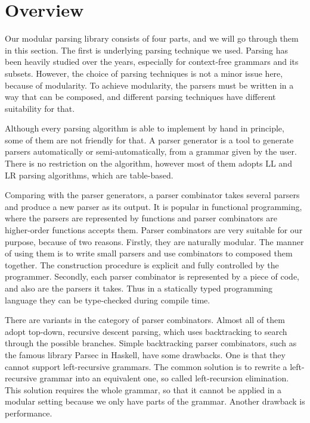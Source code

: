 \section{Overview}\label{sec:overview}

Our modular parsing library consists of four parts, and we will go through them in this section. The first is underlying parsing technique we used. Parsing has been heavily studied over the years, especially for context-free grammars and its subsets. However, the choice of parsing techniques is not a minor issue here, because of modularity. To achieve modularity, the parsers must be written in a way that can be composed, and different parsing techniques have different suitability for that.

Although every parsing algorithm is able to implement by hand in principle, some of them are not friendly for that. A parser generator is a tool to generate parsers automatically or semi-automatically, from a grammar given by the user. There is no restriction on the algorithm, however most of them adopts LL and LR parsing algorithms, which are table-based.


Comparing with the parser generators, a parser combinator takes several parsers and produce a new parser as its output. It is popular in functional programming, where the parsers are represented by functions and parser combinators are higher-order functions accepts them. Parser combinators are very suitable for our purpose, because of two reasons. Firstly, they are naturally modular. The manner of using them is to write small parsers and use combinators to composed them together. The construction procedure is explicit and fully controlled by the programmer. Secondly, each parser combinator is represented by a piece of code, and also are the parsers it takes. Thus in a statically typed programming language they can be type-checked during compile time.

There are variants in the category of parser combinators. Almost all of them adopt top-down, recursive descent parsing, which uses backtracking to search through the possible branches. Simple backtracking parser combinators, such as the famous library Parsec in Haskell, have some drawbacks. One is that they cannot support left-recursive grammars. The common solution is to rewrite a left-recursive grammar into an equivalent one, so called left-recursion elimination. This solution requires the whole grammar, so that it cannot be applied in a modular setting because we only have parts of the grammar. Another drawback is performance.


